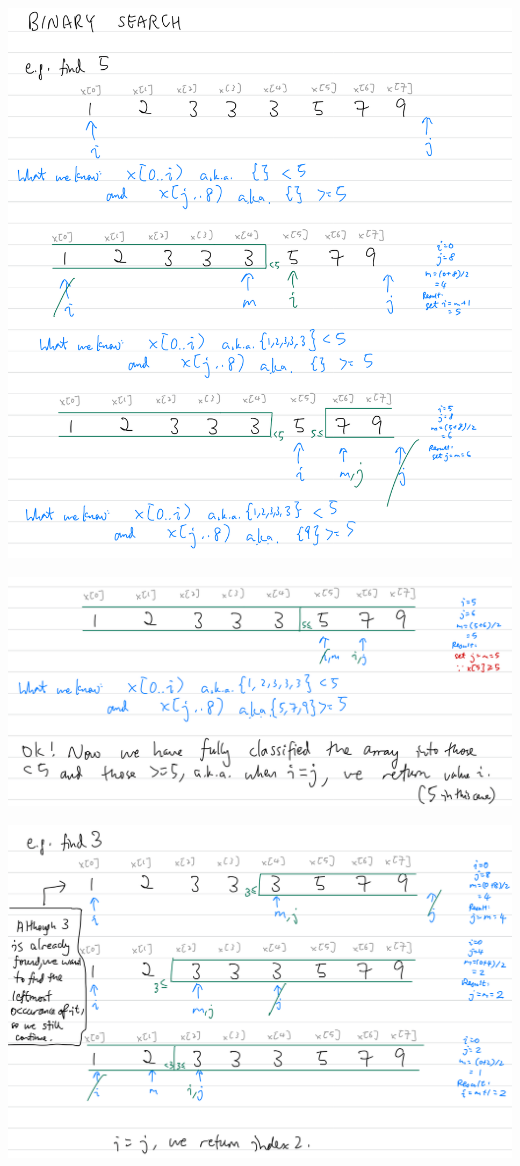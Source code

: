 \includegraphics[width=14cm]{images/ch7-binarysearch51.png}

\includegraphics[width=14cm]{images/ch7-binarysearch52.png}

\includegraphics[width=14cm]{images/ch7-binarysearch3.png}

